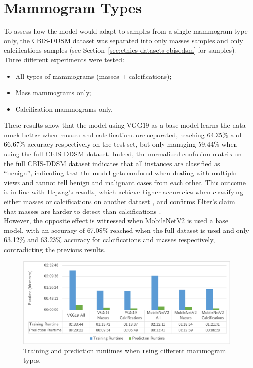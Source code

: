 \section{Mammogram Types}

To assess how the model would adapt to samples from a single mammogram type only, the CBIS-DDSM dataset was separated into only masses samples and only calcifications samples (see Section~\ref{sec:ethics-datasets-cbisddsm} for samples). Three different experiments were tested:
\begin{itemize}
    \item All types of mammograms (masses + calcifications);
    \item Mass mammograms only;
    \item Calcification mammograms only.
\end{itemize}



These results show that the model using VGG19 as a base model learns the data much better when masses and calcifications are separated, reaching 64.35\% and 66.67\% accuracy respectively on the test set, but only managing 59.44\% when using the full CBIS-DDSM dataset. Indeed, the normalised confusion matrix on the full CBIS-DDSM dataset indicates that all instances are classified as ``benign'', indicating that the model gets confused when dealing with multiple views and cannot tell benign and malignant cases from each other. This outcome is in line with Hepsag's results, which achieve higher accuracies when classifying either masses or calcifications on another dataset \citep{Hepsag2017}, and confirms Elter's claim that masses are harder to detect than calcifications \citep{Elter2009}.\\

However, the opposite effect is witnessed when MobileNetV2 is used a base model, with an accuracy of 67.08\% reached when the full dataset is used and only 63.12\% and 63.23\% accuracy for calcifications and masses respectively, contradicting the previous results.

\begin{figure}[ht]
\centerline{\includegraphics[width=\textwidth]{figures/evaluation/mammogram_type_experiment/runtimes.png}}
\caption{\label{fig:evaluation-mammogram_type_experiment-runtimes.png}Training and prediction runtimes when using different mammogram types.}
\end{figure}

